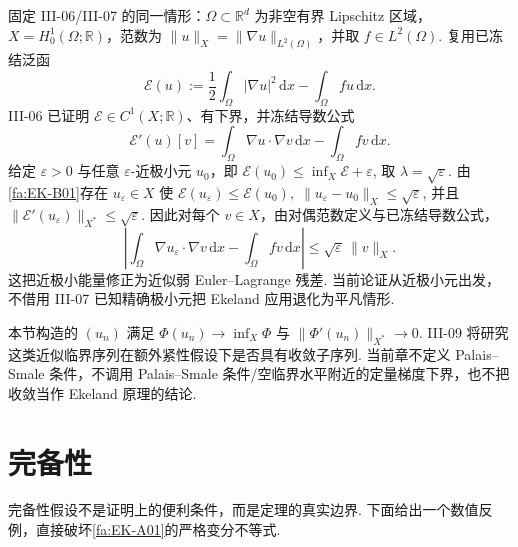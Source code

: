 \begin{FAApplication}
固定 III-06/III-07 的同一情形：\(\displaystyle\Omega\subset\mathbb R^d\) 为非空有界 Lipschitz 区域，\(\displaystyle X=H_0^1(\Omega;\mathbb R)\)，范数为 \(\displaystyle\|u\|_X=\|\nabla u\|_{L^2(\Omega)}\)，并取 \(\displaystyle f\in L^2(\Omega)\). 复用已冻结泛函
\[
\mathcal E(u)
:=
\frac{1}{2}\int_\Omega|\nabla u|^2\,\mathrm{d}x
-
\int_\Omega fu\,\mathrm{d}x.
\]
III-06 已证明 \(\displaystyle\mathcal E\in C^1(X;\mathbb R)\)、有下界，并冻结导数公式
\[
\mathcal E'(u)[v]
=
\int_\Omega\nabla u\cdot\nabla v\,\mathrm{d}x
-
\int_\Omega fv\,\mathrm{d}x.
\]
给定 \(\displaystyle\varepsilon>0\) 与任意 \(\displaystyle\varepsilon\)-近极小元 \(\displaystyle u_0\)，即
\(\displaystyle \mathcal E(u_0) \leqslant \inf_X\mathcal E+\varepsilon\),
取 \(\displaystyle\lambda=\sqrt{\varepsilon}\). 由\autoref{fa:EK-B01}存在 \(\displaystyle u_\varepsilon\in X\) 使
\(\displaystyle \mathcal E(u_\varepsilon) \leqslant \mathcal E(u_0), \; \|u_\varepsilon-u_0\|_X \leqslant \sqrt{\varepsilon}\),
并且
\(\displaystyle \|\mathcal E'(u_\varepsilon)\|_{X^*} \leqslant \sqrt{\varepsilon}\).
因此对每个 \(\displaystyle v\in X\)，由对偶范数定义与已冻结导数公式，
\[
\left|
\int_\Omega\nabla u_\varepsilon\cdot\nabla v\,\mathrm{d}x
-
\int_\Omega fv\,\mathrm{d}x
\right|
\leqslant
\sqrt{\varepsilon}\,\|v\|_X.
\]
这把近极小能量修正为近似弱 Euler--Lagrange 残差. 当前论证从近极小元出发，不借用 III-07 已知精确极小元把 Ekeland 应用退化为平凡情形.
\end{FAApplication}

\begin{FARemark}[III-09 接口]
本节构造的 \(\displaystyle(u_n)\) 满足 \(\displaystyle\Phi(u_n)\to\inf_X\Phi\) 与 \(\displaystyle\|\Phi'(u_n)\|_{X^*}\to0\). III-09 将研究这类近似临界序列在额外紧性假设下是否具有收敛子序列. 当前章不定义 Palais--Smale 条件，不调用 Palais--Smale 条件/空临界水平附近的定量梯度下界，也不把收敛当作 Ekeland 原理的结论.
\end{FARemark}

\section{完备性}\label{sec:iii08-completeness}

完备性假设不是证明上的便利条件，而是定理的真实边界. 下面给出一个数值反例，直接破坏\autoref{fa:EK-A01}的严格变分不等式.

